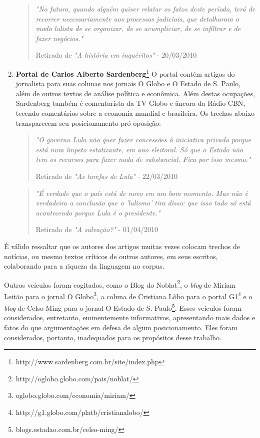 \begin{enumerate}
\begin{quote}

\emph{"No futuro, quando alguém quiser relatar os fatos deste período, terá de recorrer necessariamente aos processos judiciais, que detalharam o modo lulista de se organizar, de se acumpliciar, de se infiltrar e de fazer negócios."}

{\small Retirado de \emph{"A história em inquéritos"} - 20/03/2010}
\end{quote}

\item \textbf{Portal de Carlos Alberto Sardenberg}\footnote{http://www.sardenberg.com.br/site/index.php} O portal contém artigos do jornalista para suas colunas nos jornais O Globo e O Estado de S. Paulo, além de outros textos de análise política e econômica. Além destas ocupações, Sardenberg também é comentarista da TV Globo e âncora da Rádio CBN, tecendo comentários sobre a economia mundial e brasileira. Os trechos abaixo transparecem seu posicionamento pró-oposição: 

\begin{quote}

\emph{"O governo Lula não quer fazer concessões à iniciativa privada porque está num ímpeto estatizante, em ano eleitoral. Só que o Estado não tem os recursos para fazer nada de substancial. Fica por isso mesmo."}

{\small Retirado de \emph{"As tarefas de Lula"} - 22/03/2010}
\end{quote}

\begin{quote}

\emph{"É verdade que o país está de novo em um bom momento. Mas não é verdadeira a conclusão que o 'lulismo' tira disso: que isso tudo só está acontecendo porque Lula é o presidente."}

{\small Retirado de \emph{"A salvação?"} - 01/04/2010}
\end{quote}
\end{enumerate}

É válido ressaltar que os autores dos artigos muitas vezes colocam trechos de notícias, ou mesmo textos críticos de outros autores, em seus escritos, colaborando para a riqueza da linguagem no corpus.

Outros veículos foram cogitados, como o Blog do Noblat\footnote{http://oglobo.globo.com/pais/noblat/}, o \emph{blog} de Miriam Leitão para o jornal O Globo\footnote{oglobo.globo.com/economia/miriam/}, a coluna de Cristiana Lôbo para o portal G1\footnote{http://g1.globo.com/platb/cristianalobo/} e o \emph{blog} de Celso Ming para o jornal O Estado de S. Paulo\footnote{blogs.estadao.com.br/celso-ming/ }. Esses veículos foram considerados, entretanto, eminentemente informativos, apresentando mais dados e fatos do que argumentações em defesa de algum posicionamento. Eles foram considerados, portanto, inadequados para os propósitos desse trabalho. 

